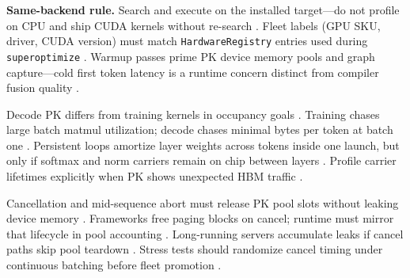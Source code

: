 \textbf{Same-backend rule.} Search and execute on the installed target---do not profile on CPU and ship CUDA kernels without re-search \citep{yirage2026,chen2020compilerbasedhardw,patel2025llminference,dlbook,amd2024xdna,amd2024aie,semianalysis2024tma,taxbreak2026,memoryfloor2026,kwon2023vllm,liu2024deepseekv3,nvidia2024cudagraphs,dao2022flashattention,dao2023flashdecoding,nvidia2022hopper,dlbook}. Fleet labels (GPU SKU, driver, CUDA version) must match \texttt{HardwareRegistry} entries used during \texttt{superoptimize} \citep{yirage2026,chen2020compilerbasedhardw,patel2025llminference,dlbook}. Warmup passes prime PK device memory pools and graph capture---cold first token latency is a runtime concern distinct from compiler fusion quality \citep{memoryfloor2026,nvidia2024cudagraphs,yirage2026,chen2020compilerbasedhardw,patel2025llminference,kwon2023vllm,taxbreak2026,dao2022flashattention,dlbook}.

Decode PK differs from training kernels in occupancy goals \citep{patel2025llminference,dao2022flashattention,memoryfloor2026,yirage2026,chen2020compilerbasedhardw,dlbook}. Training chases large batch matmul utilization; decode chases minimal bytes per token at batch one \citep{patel2025llminference,taxbreak2026,memoryfloor2026,yirage2026,chen2020compilerbasedhardw,dlbook}. Persistent loops amortize layer weights across tokens inside one launch, but only if softmax and norm carriers remain on chip between layers \citep{dao2022flashattention,yirage2026,chen2020compilerbasedhardw,memoryfloor2026,patel2025llminference,dlbook}. Profile carrier lifetimes explicitly when PK shows unexpected HBM traffic \citep{memoryfloor2026,yirage2026,chen2020compilerbasedhardw,patel2025llminference,dlbook}.

Cancellation and mid-sequence abort must release PK pool slots without leaking device memory \citep{kwon2023vllm,yirage2026,chen2020compilerbasedhardw,patel2025llminference,dlbook}. Frameworks free paging blocks on cancel; runtime must mirror that lifecycle in pool accounting \citep{kwon2023vllm,patel2025llminference,yirage2026,chen2020compilerbasedhardw,dlbook}. Long-running servers accumulate leaks if cancel paths skip pool teardown \citep{patel2025llminference,yirage2026,chen2020compilerbasedhardw,kwon2023vllm,dlbook}. Stress tests should randomize cancel timing under continuous batching before fleet promotion \citep{kwon2023vllm,patel2025llminference,yirage2026,chen2020compilerbasedhardw,dlbook}.

